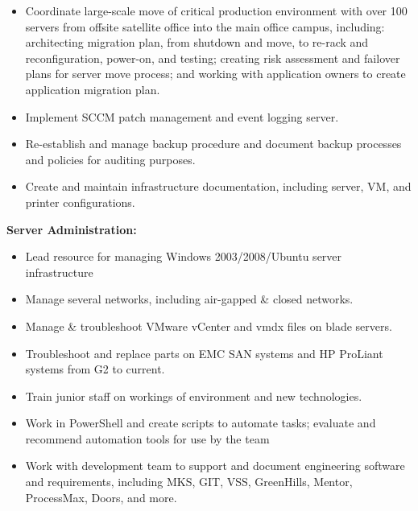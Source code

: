 \documentclass[]{article}
\providecommand{\tightlist}{%
  \setlength{\itemsep}{0pt}\setlength{\parskip}{0pt}}
\begin{document}
\begin{itemize}
\tightlist
\item
  Coordinate large-scale move of critical production environment with
  over 100 servers from offsite satellite office into the main office
  campus, including: architecting migration plan, from shutdown and
  move, to re-rack and reconfiguration, power-on, and testing; creating
  risk assessment and failover plans for server move process; and
  working with application owners to create application migration plan.
\item
  Implement SCCM patch management and event logging server.
\item
  Re-establish and manage backup procedure and document backup processes
  and policies for auditing purposes.
\item
  Create and maintain infrastructure documentation, including server,
  VM, and printer configurations.
\end{itemize}

\textbf{Server Administration:}

\begin{itemize}
\tightlist
\item
  Lead resource for managing Windows 2003/2008/Ubuntu server
  infrastructure
\item
  Manage several networks, including air-gapped \& closed networks.
\item
  Manage \& troubleshoot VMware vCenter and vmdx files on blade servers.
\item
  Troubleshoot and replace parts on EMC SAN systems and HP ProLiant
  systems from G2 to current.
\item
  Train junior staff on workings of environment and new technologies.
\item
  Work in PowerShell and create scripts to automate tasks; evaluate and
  recommend automation tools for use by the team
\item
  Work with development team to support and document engineering
  software and requirements, including MKS, GIT, VSS, GreenHills,
  Mentor, ProcessMax, Doors, and more.
\end{itemize}
\end{document}
